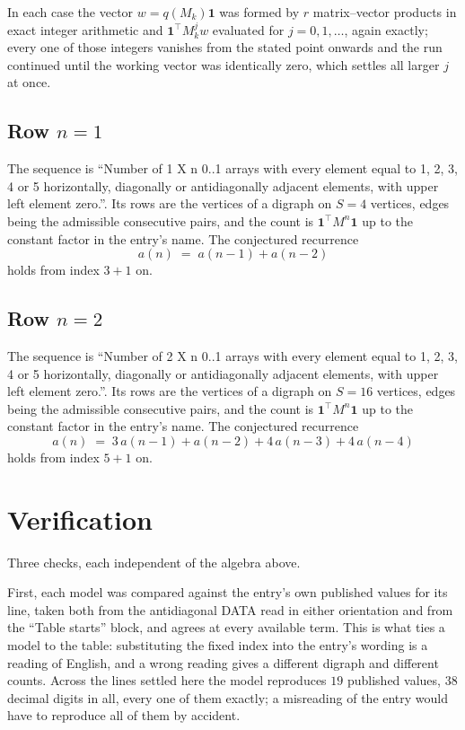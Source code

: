 \documentclass[11pt,a4paper]{article}
\theoremstyle{plain}
\theoremstyle{definition}
\begin{document}
In each case the vector $w=q(M_k)\mathbf{1}$ was formed by $r$ matrix--vector products in
exact integer arithmetic and $\mathbf{1}^{\!\top}M_k^{j}w$ evaluated for $j=0,1,\dots$,
again exactly; every one of those integers vanishes from the stated point onwards and the run
continued until the working vector was identically zero, which settles all larger $j$ at once.

\subsection*{Row $n$$=1$}
The sequence is ``Number of 1 X n 0..1 arrays with every element equal to 1, 2, 3, 4 or 5 horizontally, diagonally or antidiagonally adjacent elements, with upper left element zero.''. Its rows are the vertices of a digraph on
$S=4$ vertices, edges being the admissible consecutive pairs, and the count is
$\mathbf{1}^{\!\top}M^{n}\mathbf{1}$ up to the constant factor in the entry's name.
The conjectured recurrence
\[
a(n)\;=\;a(n-1) + a(n-2)
\]
holds from index $3+1$ on.

\subsection*{Row $n$$=2$}
The sequence is ``Number of 2 X n 0..1 arrays with every element equal to 1, 2, 3, 4 or 5 horizontally, diagonally or antidiagonally adjacent elements, with upper left element zero.''. Its rows are the vertices of a digraph on
$S=16$ vertices, edges being the admissible consecutive pairs, and the count is
$\mathbf{1}^{\!\top}M^{n}\mathbf{1}$ up to the constant factor in the entry's name.
The conjectured recurrence
\[
a(n)\;=\;3\,a(n-1) + a(n-2) + 4\,a(n-3) + 4\,a(n-4)
\]
holds from index $5+1$ on.

\section{Verification}

Three checks, each independent of the algebra above.

First, each model was compared against the entry's own published values for its line, taken
both from the antidiagonal DATA read in either orientation and from the ``Table starts''
block, and agrees at every available term. This is what ties a model to the table:
substituting the fixed index into the entry's wording is a reading of English, and a wrong
reading gives a different digraph and different counts. Across the lines settled here the
model reproduces $19$ published values, $38$ decimal digits in all, every one of
them exactly; a misreading of the entry would have to reproduce all of them by accident.
\end{document}
